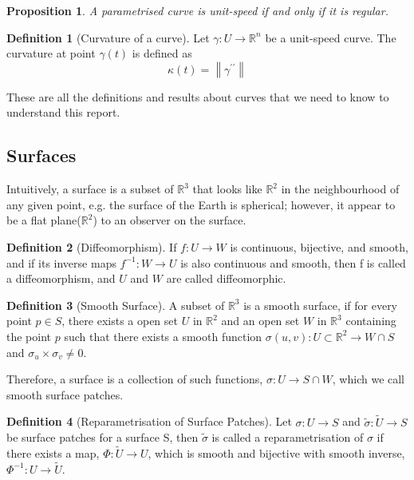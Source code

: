 \documentclass{article}
\theoremstyle{plain}
\newtheorem{proposition}{Proposition}
\theoremstyle{definition}
\newtheorem{definition}{Definition}
\theoremstyle{remark}
\newcommand{\R}{\mathbb{R}}
\begin{document}
\begin{proposition}
    A parametrised curve is unit-speed if and only if it is regular.
\end{proposition}

\begin{definition}[Curvature of a curve] \label{definition: Curvature of a curve}
    Let \( \gamma: U \rightarrow \R^n \) be a unit-speed curve. The curvature at point \( \gamma(t) \) is defined as \[ \kappa(t) = \left\lVert \gamma^{\prime\prime} \right\rVert  \]
\end{definition}

These are all the definitions and results about curves that we need to know to understand this report.
\subsection{Surfaces}
Intuitively, a surface is a subset of \( \R^3 \) that looks like \( \R^2 \)  in the neighbourhood of any given point, e.g. the surface of the Earth is spherical; however, it appear to be a flat plane(\( \R^2 \)) to an observer on the surface.

\begin{definition}[Diffeomorphism]
    If \( f: U \rightarrow W \) is continuous, bijective, and smooth, and if its inverse maps \( f^{-1}: W \rightarrow U\) is also continuous and smooth, then f is called a diffeomorphism, and \(U\) and \(W\) are called diffeomorphic.
\end{definition}

\begin{definition}[Smooth Surface]
    A subset of \( \R^3 \) is a smooth surface, if for every point \( p \in S \), there exists a open set \( U \text{ in } \R^2\) and an open set \( W \text{ in } \R^3\) containing the point \(p\) such that there exists a smooth function \( \sigma(u,v): U \subset \R^2 \rightarrow W \cap S \) and \( \sigma_u \times \sigma_v \neq 0\).
\end{definition}

Therefore, a surface is a collection of such functions, \( \sigma: U \rightarrow S \cap W \), which we call smooth surface patches.

\begin{definition}[Reparametrisation of Surface Patches]
    Let \( \sigma: U \rightarrow S\) and \( \tilde{\sigma}: \tilde{U} \rightarrow S\) be surface patches for a surface S, then \( \tilde{\sigma} \) is called a reparametrisation of \( \sigma \) if there exists a map, \( \Phi: \tilde{U} \rightarrow U \), which is smooth and bijective with smooth inverse, \( \Phi^{-1}: U \rightarrow \tilde{U} \).
\end{definition}
\end{document}
